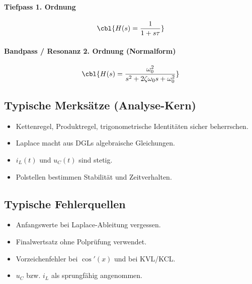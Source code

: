 \paragraph{Tiefpass 1. Ordnung}
\[
\cbl{H(s)=\frac{1}{1+s\tau}}
\]

\paragraph{Bandpass / Resonanz 2. Ordnung (Normalform)}
\[
\cbl{H(s)=\frac{\omega_0^2}{s^2+2\zeta\omega_0 s+\omega_0^2}}
\]

\subsection{Typische Merksätze (Analyse-Kern)}

\begin{itemize}
    \item Kettenregel, Produktregel, trigonometrische Identitäten sicher beherrschen.
    \item Laplace macht aus DGLs algebraische Gleichungen.
    \item $i_L(t)$ und $u_C(t)$ sind stetig.
    \item Polstellen bestimmen Stabilität und Zeitverhalten.
\end{itemize}

\subsection{Typische Fehlerquellen}

\begin{itemize}
    \item Anfangswerte bei Laplace-Ableitung vergessen.
    \item Finalwertsatz ohne Polprüfung verwendet.
    \item Vorzeichenfehler bei $\cos'(x)$ und bei KVL/KCL.
    \item $u_C$ bzw. $i_L$ als sprungfähig angenommen.
\end{itemize}
